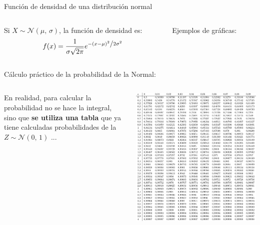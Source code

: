\documentclass[11pt]{beamer}
\begin{document}
\begin{frame}{Función de densidad de una distribución normal}  
\begin{columns}
\begin{column}{0.4\textwidth}
\begin{block}{}
Si $
X \sim \mathcal{N}(\mu,\,\sigma)
    $, la función de densidad es:
    $$f(x)=\frac{1}{{\sigma \sqrt {2\pi } }}e^{{{ - \left( {x - \mu } \right)^2 } \mathord{\left/ {\vphantom {{ - \left( {x - \mu } \right)^2 } {2\sigma ^2 }}} \right. \kern-\nulldelimiterspace} {2\sigma ^2 }}}$$
\end{block}
\end{column}
\begin{column}{0.6\textwidth} Ejemplos de gráficas:

\end{column}
\end{columns}{}

\end{frame}

\begin{frame}{Cálculo práctico de la probabilidad de la Normal:}
\begin{columns}
\begin{column}{0.4\textwidth}
\begin{block}{}
En realidad, para calcular la probabilidad no se hace la integral, sino que \textbf{se utiliza una tabla} que ya tiene calculadas probabilidades de la  $Z \sim \mathcal{N}(0,\,1)
    $ ...
\end{block}
\end{column}
\begin{column}{0.6\textwidth}
\includegraphics[page=1,width=1\textwidth]{probabilidad/distribucion_normal}
\end{column}
\end{columns}


\end{frame}
\end{document}

